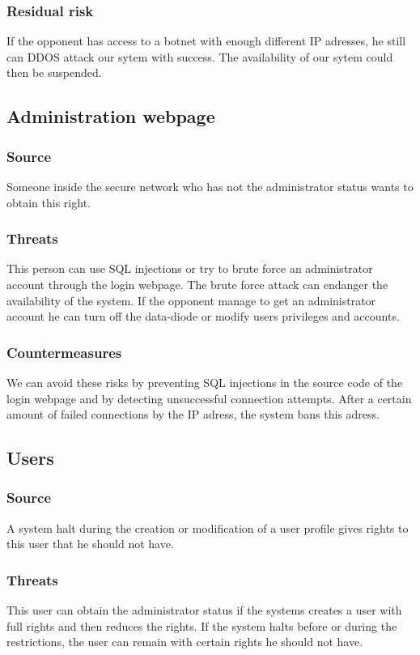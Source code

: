 \documentclass[a4paper,11pt]{article}
\begin{document}
\subsubsection{Residual risk}
If the opponent has access to a botnet with enough different IP adresses, he still can DDOS attack our sytem with success. The availability of our sytem could then be suspended.
\subsection{Administration webpage}
\subsubsection{Source}
Someone inside the secure network who has not the administrator status wants to obtain this right.
\subsubsection{Threats}
This person can use SQL injections or try to brute force an administrator account through the login webpage. The brute force attack can endanger the availability of the system. If the opponent manage to get an administrator account he can turn off the data-diode or modify users privileges and accounts.
\subsubsection{Countermeasures}
We can avoid these risks by preventing SQL injections in the source code of the login webpage and by detecting unsuccessful connection attempts. After a certain amount of failed connections by the IP adress, the system bans this adress.
\subsection{Users}
\subsubsection{Source}
A system halt during the creation or modification of a user profile gives rights to this user that he should not have.
\subsubsection{Threats}
This user can obtain the administrator status if the systems creates a user with full rights and then reduces the rights. If the system halts before or during the restrictions, the user can remain with certain rights he should not have.
\end{document}
